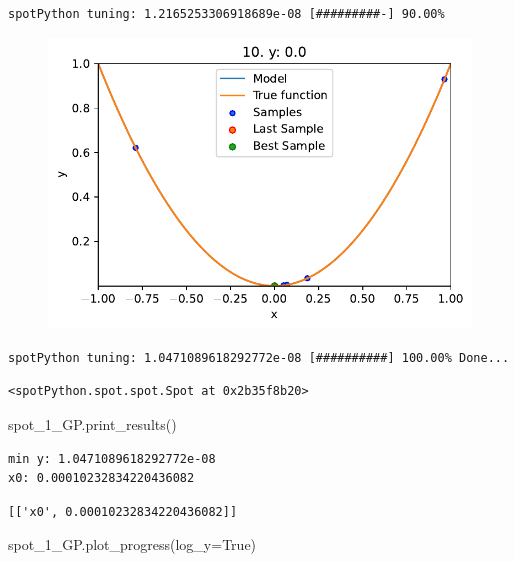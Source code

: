 \documentclass[
  letterpaper,
  DIV=11,
  numbers=noendperiod]{scrreprt}
\newenvironment{Shaded}{\begin{snugshade}}{\end{snugshade}}
\newcommand{\NormalTok}[1]{\textcolor[rgb]{0.00,0.23,0.31}{#1}}
\newcommand{\OperatorTok}[1]{\textcolor[rgb]{0.37,0.37,0.37}{#1}}
\newcommand{\VariableTok}[1]{\textcolor[rgb]{0.07,0.07,0.07}{#1}}
\begin{document}
\begin{verbatim}
spotPython tuning: 1.2165253306918689e-08 [#########-] 90.00% 
\end{verbatim}

\begin{figure}[H]

{\centering \includegraphics{04_spot_sklearn_surrogate_files/figure-pdf/cell-25-output-14.pdf}

}

\end{figure}

\begin{verbatim}
spotPython tuning: 1.0471089618292772e-08 [##########] 100.00% Done...
\end{verbatim}

\begin{verbatim}
<spotPython.spot.spot.Spot at 0x2b35f8b20>
\end{verbatim}

\begin{Shaded}
\begin{Highlighting}[]
\NormalTok{spot\_1\_GP.print\_results()}
\end{Highlighting}
\end{Shaded}

\begin{verbatim}
min y: 1.0471089618292772e-08
x0: 0.00010232834220436082
\end{verbatim}

\begin{verbatim}
[['x0', 0.00010232834220436082]]
\end{verbatim}

\begin{Shaded}
\begin{Highlighting}[]
\NormalTok{spot\_1\_GP.plot\_progress(log\_y}\OperatorTok{=}\VariableTok{True}\NormalTok{)}
\end{Highlighting}
\end{Shaded}
\end{document}
